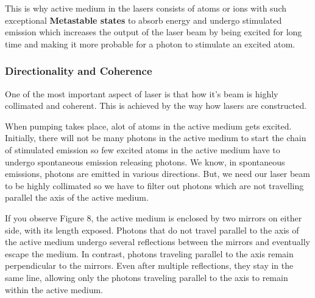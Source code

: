 \documentclass[12pt]{article}
\begin{document}
This is why active medium in the lasers consists of atoms or ions with such exceptional \textbf{Metastable states} to absorb energy and undergo stimulated emission which increases the output of the laser beam by being excited for long time and making it more probable for a photon to stimulate an excited atom.

\subsubsection{Directionality and Coherence}

One of the most important aspect of laser is that how it's beam is highly collimated and coherent. This is achieved by the way how lasers are constructed. \vspace{.2cm}

When pumping takes place, alot of atoms in the active medium gets excited. Initially, there will not be many photons in the active medium to start the chain of stimulated emission so few excited atoms in the active medium have to undergo spontaneous emission releasing photons. We know, in spontaneous emissions, photons are emitted in various directions. But, we need our laser beam to be highly collimated so we have to filter out photons which are not travelling parallel the axis of the active medium. \vspace{.2cm}

If you observe Figure 8, the active medium is enclosed by two mirrors on either side, with its length exposed. Photons that do not travel parallel to the axis of the active medium undergo several reflections between the mirrors and eventually escape the medium. In contrast, photons traveling parallel to the axis remain perpendicular to the mirrors. Even after multiple reflections, they stay in the same line, allowing only the photons traveling parallel to the axis to remain within the active medium.
\end{document}
